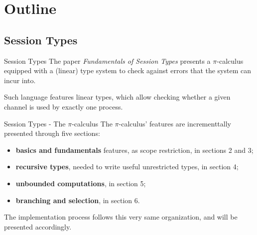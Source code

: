 \section{Outline}

\subsection{Session Types}

\begin{frame}{Session Types}
    The paper \emph{Fundamentals of Session Types} %
    presents a $\pi$-calculus equipped with a (linear) type system to check against errors that the system can incur into.

    Such language features linear types, which allow checking whether a given channel is used by exactly one process.
\end{frame}

\begin{frame}{Session Types - The $\pi$-calculus}
    The $\pi$-calculus' features are incrementtally presented through five sections:
    \begin{itemize}
        \item \textbf{basics and fundamentals} features, as scope restriction, in sections 2 and 3;
        \item \textbf{recursive types}, needed to write useful unrestricted types, in section 4;
        \item \textbf{unbounded computations}, in section 5;
        \item \textbf{branching and selection}, in section 6.
    \end{itemize}

    The implementation process follows this very same organization, and will be presented accordingly.
\end{frame}

